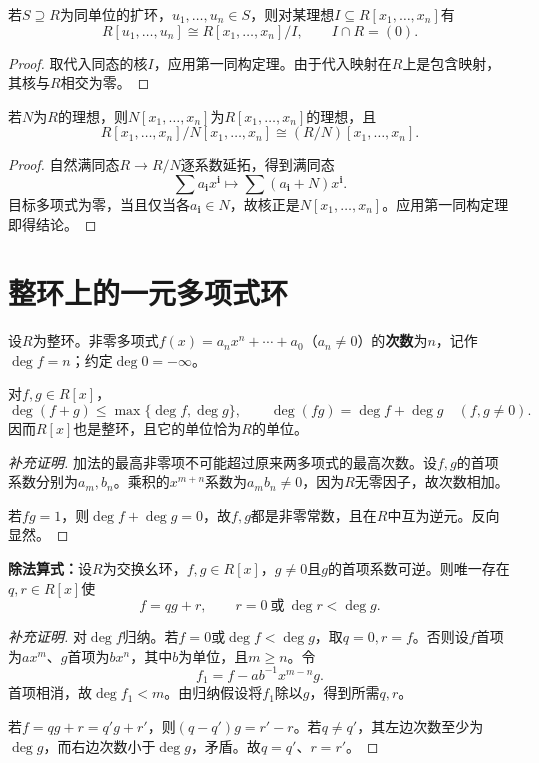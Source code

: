 \begin{corollary}
若$S\supseteq R$为同单位的扩环，$u_1,\ldots,u_n\in S$，则对某理想$I\subseteq R[x_1,\ldots,x_n]$有
\[
R[u_1,\ldots,u_n]\cong R[x_1,\ldots,x_n]/I,
\qquad I\cap R=(0).
\]
\end{corollary}
\begin{proof}
取代入同态的核$I$，应用第一同构定理。由于代入映射在$R$上是包含映射，其核与$R$相交为零。
\end{proof}

\begin{corollary}
若$N$为$R$的理想，则$N[x_1,\ldots,x_n]$为$R[x_1,\ldots,x_n]$的理想，且
\[
R[x_1,\ldots,x_n]/N[x_1,\ldots,x_n]
\cong (R/N)[x_1,\ldots,x_n].
\]
\end{corollary}
\begin{proof}
自然满同态$R\to R/N$逐系数延拓，得到满同态
\[
\sum a_{\mathbf i}x^{\mathbf i}
\longmapsto\sum(a_{\mathbf i}+N)x^{\mathbf i}.
\]
目标多项式为零，当且仅当各$a_{\mathbf i}\in N$，故核正是$N[x_1,\ldots,x_n]$。应用第一同构定理即得结论。
\end{proof}

\section{整环上的一元多项式环}

设$R$为整环。非零多项式$f(x)=a_nx^n+\cdots+a_0$（$a_n\ne0$）的\textbf{次数}为$n$，记作$\deg f=n$；约定$\deg0=-\infty$。

\begin{proposition}
对$f,g\in R[x]$，
\[
\deg(f+g)\leq\max\{\deg f,\deg g\},\qquad
\deg(fg)=\deg f+\deg g\quad(f,g\ne0).
\]
因而$R[x]$也是整环，且它的单位恰为$R$的单位。
\end{proposition}
\begin{proof}[补充证明]
加法的最高非零项不可能超过原来两多项式的最高次数。设$f,g$的首项系数分别为$a_m,b_n$。乘积的$x^{m+n}$系数为$a_mb_n\ne0$，因为$R$无零因子，故次数相加。

若$fg=1$，则$\deg f+\deg g=0$，故$f,g$都是非零常数，且在$R$中互为逆元。反向显然。
\end{proof}

\begin{theorem}\label{p2:poly-division}
\textbf{除法算式：}设$R$为交换幺环，$f,g\in R[x]$，$g\ne0$且$g$的首项系数可逆。则唯一存在$q,r\in R[x]$使
\[
f=qg+r,\qquad r=0\ \text{或}\ \deg r<\deg g.
\]
\end{theorem}
\begin{proof}[补充证明]
对$\deg f$归纳。若$f=0$或$\deg f<\deg g$，取$q=0,r=f$。否则设$f$首项为$ax^m$、$g$首项为$bx^n$，其中$b$为单位，且$m\geq n$。令
\[
f_1=f-ab^{-1}x^{m-n}g.
\]
首项相消，故$\deg f_1<m$。由归纳假设将$f_1$除以$g$，得到所需$q,r$。

若$f=qg+r=q'g+r'$，则$(q-q')g=r'-r$。若$q\ne q'$，其左边次数至少为$\deg g$，而右边次数小于$\deg g$，矛盾。故$q=q'$、$r=r'$。
\end{proof}

